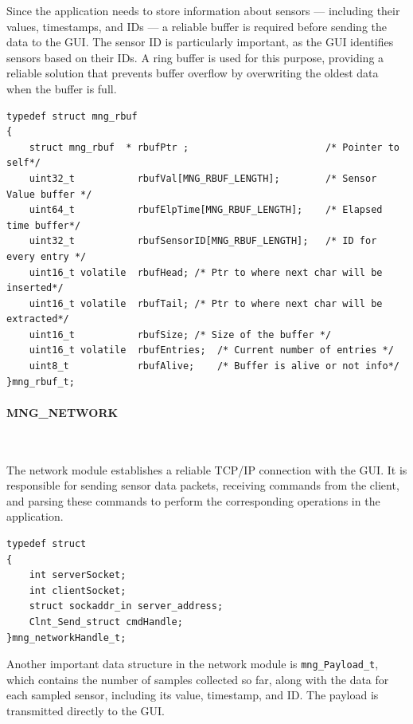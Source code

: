 Since the application needs to store information about sensors — including their values, 
timestamps, and IDs — a reliable buffer is required before sending the data to the GUI. 
The sensor ID is particularly important, as the GUI identifies sensors based on their 
IDs. A ring buffer is used for this purpose, providing a reliable solution that prevents 
buffer overflow by overwriting the oldest data when the buffer is full.

\begin{lstlisting}[caption={MNG Ring Buffer handle structure}, label={lst:rbufhandle}]
typedef struct mng_rbuf
{
    struct mng_rbuf  * rbufPtr ;                        /* Pointer to self*/
    uint32_t           rbufVal[MNG_RBUF_LENGTH];        /* Sensor Value buffer */
    uint64_t           rbufElpTime[MNG_RBUF_LENGTH];    /* Elapsed time buffer*/
    uint32_t           rbufSensorID[MNG_RBUF_LENGTH];   /* ID for every entry */   
    uint16_t volatile  rbufHead; /* Ptr to where next char will be inserted*/
    uint16_t volatile  rbufTail; /* Ptr to where next char will be extracted*/
    uint16_t           rbufSize; /* Size of the buffer */
    uint16_t volatile  rbufEntries;  /* Current number of entries */
    uint8_t            rbufAlive;    /* Buffer is alive or not info*/
}mng_rbuf_t;
\end{lstlisting}



\paragraph{MNG\_NETWORK}\

The network module establishes a reliable TCP/IP connection with the GUI. It is 
responsible for sending sensor data packets, receiving commands from the client, and 
parsing these commands to perform the corresponding operations in the application.


\begin{lstlisting}[caption={MNG Network handle structure}, label={lst:networkhandle}]
typedef struct
{
    int serverSocket;
    int clientSocket;
    struct sockaddr_in server_address;
    Clnt_Send_struct cmdHandle;
}mng_networkHandle_t;
\end{lstlisting}

Another important data structure in the network module is \texttt{mng\_Payload\_t}, which 
contains the number of samples collected so far, along with the data for each sampled 
sensor, including its value, timestamp, and ID. The payload is transmitted directly to the GUI.

